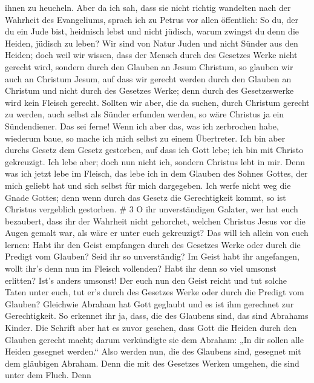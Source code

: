 ihnen zu heucheln.  Aber da ich sah, dass sie nicht richtig
wandelten nach der Wahrheit des Evangeliums, sprach ich zu Petrus vor
allen öffentlich: So du, der du ein Jude bist, heidnisch lebst und nicht
jüdisch, warum zwingst du denn die Heiden, jüdisch zu leben?
 Wir sind von Natur Juden und nicht Sünder aus den Heiden;
 doch weil wir wissen, dass der Mensch durch des Gesetzes
Werke nicht gerecht wird, sondern durch den Glauben an Jesum Christum,
so glauben wir auch an Christum Jesum, auf dass wir gerecht werden durch
den Glauben an Christum und nicht durch des Gesetzes Werke; denn durch
des Gesetzeswerke wird kein Fleisch gerecht.  Sollten wir
aber, die da suchen, durch Christum gerecht zu werden, auch selbst als
Sünder erfunden werden, so wäre Christus ja ein Sündendiener. Das sei
ferne!  Wenn ich aber das, was ich zerbrochen habe,
wiederum baue, so mache ich mich selbst zu einem Übertreter.
 Ich bin aber durchs Gesetz dem Gesetz gestorben, auf dass
ich Gott lebe; ich bin mit Christo gekreuzigt.  Ich lebe
aber; doch nun nicht ich, sondern Christus lebt in mir. Denn was ich
jetzt lebe im Fleisch, das lebe ich in dem Glauben des Sohnes Gottes,
der mich geliebt hat und sich selbst für mich dargegeben. 
Ich werfe nicht weg die Gnade Gottes; denn wenn durch das Gesetz die
Gerechtigkeit kommt, so ist Christus vergeblich gestorben. \# 3
 O ihr unverständigen Galater, wer hat euch bezaubert, dass
ihr der Wahrheit nicht gehorchet, welchen Christus Jesus vor die Augen
gemalt war, als wäre er unter euch gekreuzigt?  Das will ich
allein von euch lernen: Habt ihr den Geist empfangen durch des Gesetzes
Werke oder durch die Predigt vom Glauben?  Seid ihr so
unverständig? Im Geist habt ihr angefangen, wollt ihr's denn nun im
Fleisch vollenden?  Habt ihr denn so viel umsonst erlitten?
Ist's anders umsonst!  Der euch nun den Geist reicht und tut
solche Taten unter euch, tut er's durch des Gesetzes Werke oder durch
die Predigt vom Glauben?  Gleichwie Abraham hat Gott
geglaubt und es ist ihm gerechnet zur Gerechtigkeit.  So
erkennet ihr ja, dass, die des Glaubens sind, das sind Abrahams Kinder.
 Die Schrift aber hat es zuvor gesehen, dass Gott die Heiden
durch den Glauben gerecht macht; darum verkündigte sie dem Abraham: „In
dir sollen alle Heiden gesegnet werden.``  Also werden nun,
die des Glaubens sind, gesegnet mit dem gläubigen Abraham. 
Denn die mit des Gesetzes Werken umgehen, die sind unter dem Fluch. Denn
